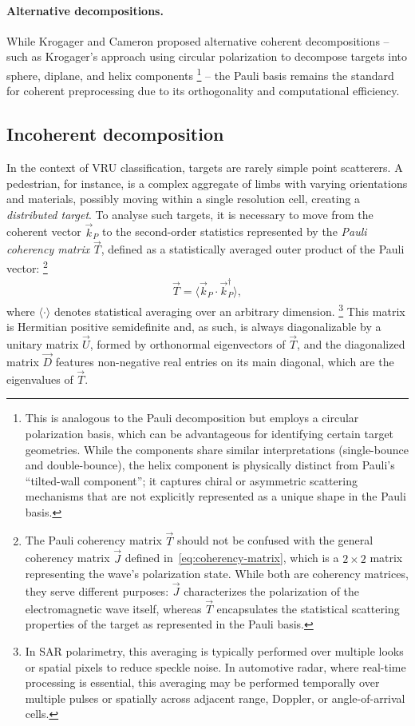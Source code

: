 \paragraph{Alternative decompositions.}
While Krogager and Cameron proposed alternative coherent decompositions -- such as Krogager's approach using circular polarization to decompose targets into sphere, diplane, and helix components%
    \footnote{
        This is analogous to the Pauli decomposition but employs a circular polarization basis, which can be advantageous for identifying certain target geometries.
        While the components share similar interpretations (single-bounce and double-bounce), the helix component is physically distinct from Pauli's \enquote{tilted-wall component}; it captures chiral or asymmetric scattering mechanisms that are not explicitly represented as a unique shape in the Pauli basis.
    }
-- the Pauli basis remains the standard for coherent preprocessing due to its orthogonality and computational efficiency.


\subsection{Incoherent decomposition}
\label{sec:incoherent-decomposition}

In the context of VRU classification, targets are rarely simple point scatterers.
A pedestrian, for instance, is a complex aggregate of limbs with varying orientations and materials, possibly moving within a single resolution cell, creating a \emph{distributed target}.
To analyse such targets, it is necessary to move from the coherent vector $\vec k_P$ to the second-order statistics represented by the \emph{Pauli coherency matrix} $\vec T$, defined as a statistically averaged outer product of the Pauli vector:%
    \footnote{
        The Pauli coherency matrix $\vec T$ should not be confused with the general coherency matrix $\vec J$ defined in~\cref{eq:coherency-matrix}, which is a $2 \times 2$ matrix representing the wave's polarization state.
        While both are coherency matrices, they serve different purposes: $\vec J$ characterizes the polarization of the electromagnetic wave itself, whereas $\vec T$ encapsulates the statistical scattering properties of the target as represented in the Pauli basis.
    }
\begin{align}
    \vec T = \langle \vec k_P \cdot \vec k_P^\dagger \rangle,
\end{align}
where $\langle\cdot\rangle$ denotes statistical averaging over an arbitrary dimension.%
    \footnote{
        In SAR polarimetry, this averaging is typically performed over multiple looks or spatial pixels to reduce speckle noise.
        In automotive radar, where real-time processing is essential, this averaging may be performed temporally over multiple pulses or spatially across adjacent range, Doppler, or angle-of-arrival cells.
    }
This matrix is Hermitian positive semidefinite and, as such, is always diagonalizable by a unitary matrix $\vec U$, formed by orthonormal eigenvectors of $\vec T$, and the diagonalized matrix $\vec D$ features non-negative real entries on its main diagonal, which are the eigenvalues of $\vec T$.

